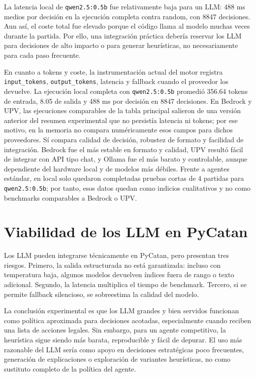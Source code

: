 ﻿\documentclass[10pt,a4paper]{article}
\begin{document}
La latencia local de \texttt{qwen2.5:0.5b} fue relativamente baja para un LLM: 488 ms medios por decisión en la ejecución completa contra random, con 8847 decisiones. Aun así, el coste total fue elevado porque el código llama al modelo muchas veces durante la partida. Por ello, una integración práctica debería reservar los LLM para decisiones de alto impacto o para generar heurísticas, no necesariamente para cada paso frecuente.

En cuanto a tokens y coste, la instrumentación actual del motor registra \texttt{input\_tokens}, \texttt{output\_tokens}, latencia y fallback cuando el proveedor los devuelve. La ejecución local completa con \texttt{qwen2.5:0.5b} promedió 356.64 tokens de entrada, 8.05 de salida y 488 ms por decisión en 8847 decisiones. En Bedrock y UPV, las ejecuciones comparables de la tabla principal salieron de una versión anterior del resumen experimental que no persistía latencia ni tokens; por ese motivo, en la memoria no compara numéricamente esos campos para dichos proveedores. Sí compara calidad de decisión, robustez de formato y facilidad de integración. Bedrock fue el más estable en formato y calidad, UPV resultó fácil de integrar con API tipo chat, y Ollama fue el más barato y controlable, aunque dependiente del hardware local y de modelos más débiles. Frente a agentes estándar, en local solo quedaron completadas pruebas cortas de 4 partidas para \texttt{qwen2.5:0.5b}; por tanto, esos datos quedan como indicios cualitativos y no como benchmarks comparables a Bedrock o UPV.

\section{Viabilidad de los LLM en PyCatan}
Los LLM pueden integrarse técnicamente en PyCatan, pero presentan tres riesgos. Primero, la salida estructurada no está garantizada: incluso con temperatura baja, algunos modelos devuelven índices fuera de rango o texto adicional. Segundo, la latencia multiplica el tiempo de benchmark. Tercero, si se permite fallback silencioso, se sobreestima la calidad del modelo.

La conclusión experimental es que los LLM grandes y bien servidos funcionan como política aproximada para decisiones acotadas, especialmente cuando reciben una lista de acciones legales. Sin embargo, para un agente competitivo, la heurística sigue siendo más barata, reproducible y fácil de depurar. El uso más razonable del LLM sería como apoyo en decisiones estratégicas poco frecuentes, generación de explicaciones o exploración de variantes heurísticas, no como sustituto completo de la política del agente.
\end{document}
